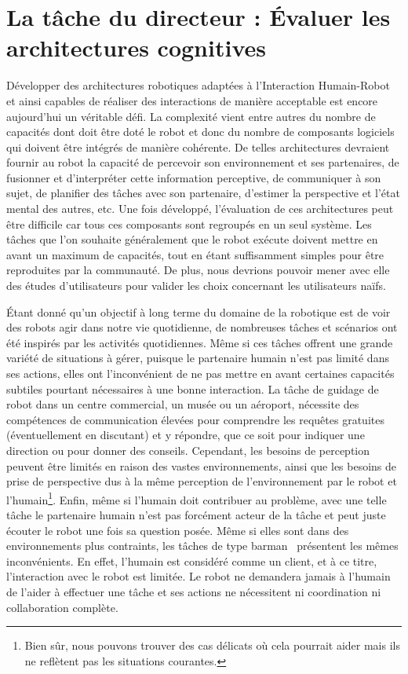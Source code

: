 \section*{La tâche du directeur : Évaluer les architectures cognitives}

Développer des architectures robotiques adaptées à l'Interaction Humain-Robot et ainsi capables de réaliser des interactions de manière acceptable est encore aujourd'hui un véritable défi. La complexité vient entre autres du nombre de capacités dont doit être doté le robot et donc du nombre de composants logiciels qui doivent être intégrés de manière cohérente. De telles architectures devraient fournir au robot la capacité de percevoir son environnement et ses partenaires, de fusionner et d'interpréter cette information perceptive, de communiquer à son sujet, de planifier des tâches avec son partenaire, d'estimer la perspective et l'état mental des autres, etc. Une fois développé, l'évaluation de ces architectures peut être difficile car tous ces composants sont regroupés en un seul système. Les tâches que l'on souhaite généralement que le robot exécute doivent mettre en avant un maximum de capacités, tout en étant suffisamment simples pour être reproduites par la communauté. De plus, nous devrions pouvoir mener avec elle des études d'utilisateurs pour valider les choix concernant les utilisateurs naïfs.

Étant donné qu'un objectif à long terme du domaine de la robotique est de voir des robots agir dans notre vie quotidienne, de nombreuses tâches et scénarios ont été inspirés par les activités quotidiennes. Même si ces tâches offrent une grande variété de situations à gérer, puisque le partenaire humain n'est pas limité dans ses actions, elles ont l'inconvénient de ne pas mettre en avant certaines capacités subtiles pourtant nécessaires à une bonne interaction.
La tâche de guidage de robot \cite{satake_2015_should} dans un centre commercial, un musée ou un aéroport, nécessite des compétences de communication élevées pour comprendre les requêtes gratuites (éventuellement en discutant) et y répondre, que ce soit pour indiquer une direction ou pour donner des conseils. Cependant, les besoins de perception peuvent être limités en raison des vastes environnements, ainsi que les besoins de prise de perspective dus à la même perception de l'environnement par le robot et l'humain\footnote{Bien sûr, nous pouvons trouver des cas délicats où cela pourrait aider mais ils ne reflètent pas les situations courantes.}. Enfin, même si l'humain doit contribuer au problème, avec une telle tâche le partenaire humain n'est pas forcément acteur de la tâche et peut juste écouter le robot une fois sa question posée. Même si elles sont dans des environnements plus contraints, les tâches de type barman~\cite{petrick_2012_social} présentent les mêmes inconvénients. En effet, l'humain est considéré comme un client, et à ce titre, l'interaction avec le robot est limitée. Le robot ne demandera jamais à l'humain de l'aider à effectuer une tâche et ses actions ne nécessitent ni coordination ni collaboration complète.

